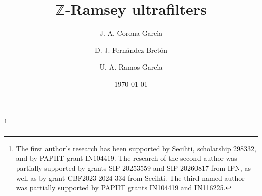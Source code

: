 \documentclass{amsart}
\theoremstyle{definition}
\theoremstyle{remark}
\numberwithin{equation}{section}
\begin{document}
\title{$\mathbb{Z}$-Ramsey ultrafilters}



\author[Corona-Garc\'{\i}a]{J. A. Corona-Garc\'{\i}a}
\address{Posgrado Conjunto en Ciencias Matem\'aticas UNAM-UMSNH\\Morelia, Michoac\'an\\ M\'exico 58089.}
\curraddr{}
\thanks{{The first author's research has been supported by Secihti, scholarship 298332, and by PAPIIT grant IN104419. The research of the second author was partially supported  by grants SIP-20253559 and SIP-20260817 from IPN, as well as by grant CBF2023-2024-334 from Secihti. The third named author was partially supported by PAPIIT grants IN104419 and IN116225.}}

\author[Fern\'{a}ndez-Bret\'{o}n]{D. J. Fern\'{a}ndez-Bret\'{o}n}
\address{Escuela Superior de F\'sica y Matem\'aticas\\ Instituto Polit\'ecnico Nacional\\ Av. Instituto Polit\'ecnico Nacional s/n Edificio 9 \\ Col. San Pedro Zacatenco\\ Alcald\'ia Gustavo A. Madero\\ 07738\\ CDMX\\ M\'exico.}
\curraddr{}

\author[Ramos-Garc\'{\i}a]{U. A. Ramos-Garc\'{\i}a}
\address{Centro de Ciencias Matem\'aticas\\ Universidad Nacional Aut\'onoma de M\'exico\\ Campus Morelia\\Morelia, Michoac\'an\\ M\'exico 58089.}
\curraddr{}

 
\date{\today}

\end{document}
